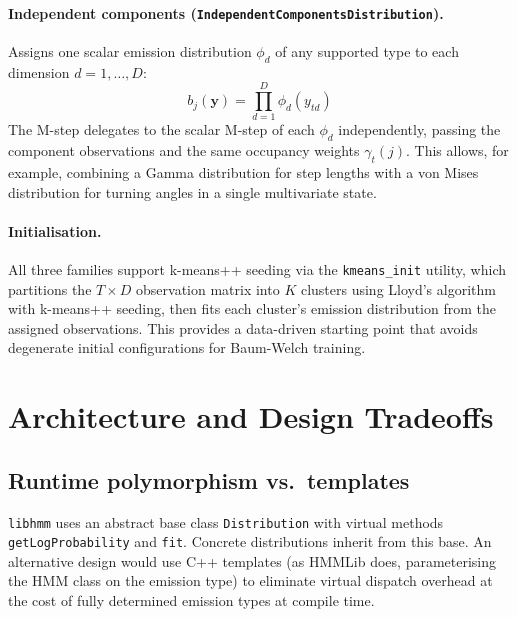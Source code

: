 \documentclass[11pt]{article}
\begin{document}
\paragraph{Independent components (\texttt{IndependentComponentsDistribution}).}
Assigns one scalar emission distribution $\phi_d$ of any supported type to each
dimension $d = 1, \ldots, D$:
\begin{equation}
  b_j(\mathbf{y}) = \prod_{d=1}^D \phi_d(y_{td})
\end{equation}
The M-step delegates to the scalar M-step of each $\phi_d$ independently,
passing the component observations and the same occupancy weights
$\gamma_t(j)$.
This allows, for example, combining a Gamma distribution for step lengths
with a von Mises distribution for turning angles in a single multivariate state.

\paragraph{Initialisation.}
All three families support k-means++ seeding via the \texttt{kmeans\_init}
utility, which partitions the $T \times D$ observation matrix into $K$ clusters
using Lloyd's algorithm with k-means++ seeding, then fits each cluster's
emission distribution from the assigned observations.
This provides a data-driven starting point that avoids degenerate initial
configurations for Baum-Welch training.

\section{Architecture and Design Tradeoffs}
\label{sec:architecture}

\subsection{Runtime polymorphism vs.\ templates}
\label{sec:arch_dispatch}

\texttt{libhmm} uses an abstract base class \texttt{Dist\-ri\-bu\-tion} with
virtual methods \texttt{get\-Log\-Prob\-ability} and \texttt{fit}.
Concrete distributions inherit from this base.
An alternative design would use C++ templates
(as HMMLib does, parameterising the HMM class on the emission type)
to eliminate virtual dispatch overhead at the cost of fully determined
emission types at compile time.
\end{document}
